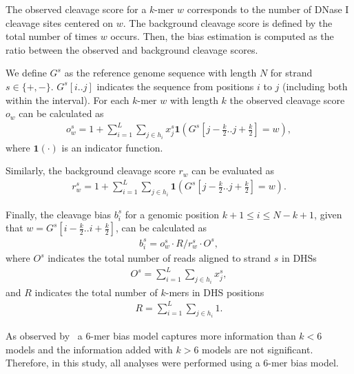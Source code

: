 \documentclass[11pt]{article}
\begin{document}
{\color{red!50!black}{We use two approaches to estimate of the intrinsic DNase I cleavage bias: (1) aligned reads inside DHSs from DNase-seq experiments (termed ``DHS approach'') and (2) all aligned reads for deproteinized (naked) DNA experiments (termed ``naked DNA approach'').}} The observed cleavage score for a $k$-mer $w$ corresponds to the number of DNase I cleavage sites centered on $w$. The background cleavage score is defined by the total number of times $w$ occurs. Then, the bias estimation is computed as the ratio between the observed and background cleavage scores. {\color{red!50!black}{Mathematical formalizations of the bias estimation will be made based on the DHS approach.}}

We define $G^s$ as the reference genome sequence with length $N$ for strand $s \in \{+,-\}$. $G^s[i..j]$ indicates the sequence from positions $i$ to $j$ (including both within the interval). For each $k$-mer $w$ with length $k$ the observed cleavage score ${o}_{w}$ can be calculated as
\begin{align}
  o_w^s = 1 + \sum_{i=1}^L \sum_{j \in h_i} x^s_j \mathbf{1}\left( G^s[j-\frac{k}{2} .. j+\frac{k}{2}] = w\right),
  \label{eq:obscleav}
\end{align}
where ${\mathbf{1}}(\cdot)$ is an indicator function.

Similarly, the background cleavage score ${r}_{w}$ can be evaluated as
\begin{align}
  r_w^s = 1 + \sum_{i=1}^L \sum_{j \in h_i} \mathbf{1} \left( G^s[j-\frac{k}{2} .. j+\frac{k}{2}] = w\right).
  \label{eq:backcleav}
\end{align}

Finally, the cleavage bias ${b}_{i}^{s}$ for a genomic position $k+1 \leq i \leq N-k+1$, given that $w=G^s[i-\frac{k}{2}..i+\frac{k}{2}]$, can be calculated as
\begin{align}
  b_i^s = o^s_w \cdot R / r^s_w \cdot O^s,
  \label{eq:cleavbias}
\end{align}
where $O^s$ indicates the total number of reads aligned to strand $s$ in DHSs
\begin{align}
O^s = \sum_{i=1}^L \sum_{j \in h_i} {x}^{s}_{j},
\label{eq:obscleav2}
\end{align}
and $R$ indicates the total number of $k$-mers in DHS positions
\begin{align}
R = \sum_{i=1}^{L}\sum_{j \in h_i} 1.
\label{eq:backcleav2}
\end{align}

{} As observed by~\cite{he2014} a $6$-mer bias model captures more information than $k < 6$ models and the information added with $k > 6$ models are not significant. Therefore, in this study, all analyses were performed using a $6$-mer bias model.
\end{document}
